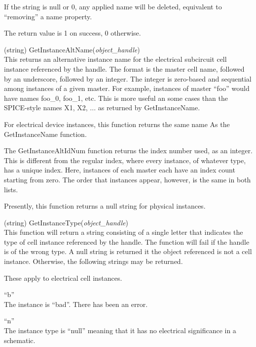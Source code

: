\begin{description}
If the string is null or 0, any applied name will be deleted,
equivalent to ``removing'' a name property.

The return value is 1 on success, 0 otherwise.

\item{(string) \vt GetInstanceAltName({\it object\_handle\/})}\\
This returns an alternative instance name for the electrical
subcircuit cell instance referenced by the handle.  The format is the
master cell name, followed by an underscore, followed by an integer. 
The integer is zero-based and sequential among instances of a given
master.  For example, instances of master ``{\vt foo}'' would have
names {\vt foo\_0}, {\vt foo\_1}, etc.  This is more useful an some
cases than the SPICE-style names {\vt X1}, {\vt X2}, ...  as returned
by {\vt GetInstanceName}.

For electrical device instances, this function returns the same
name As the {\vt GetInstanceName} function.

The {\vt GetInstanceAltIdNum} function returns the index number used,
as an integer.  This is different from the regular index, where every
instance, of whatever type, has a unique index.  Here, instances of
each master each have an index count starting from zero.  The order
that instances appear, however, is the same in both lists. 

Presently, this function returns a null string for physical instances.

\item{(string) \vt GetInstanceType({\it object\_handle\/})}\\
This function will return a string consisting of a single letter that
indicates the type of cell instance referenced by the handle.  The
function will fail if the handle is of the wrong type.  A null string
is returned it the object referenced is not a cell instance. 
Otherwise, the following strings may be returned.

These apply to electrical cell instances.
\begin{description}
\item{``b''}\\
The instance is ``bad''.  There has been an error.

\item{``n''}\\
The instance type is ``null'' meaning that it has no electrical
significance in a schematic.
  

\end{description}
\end{description}
